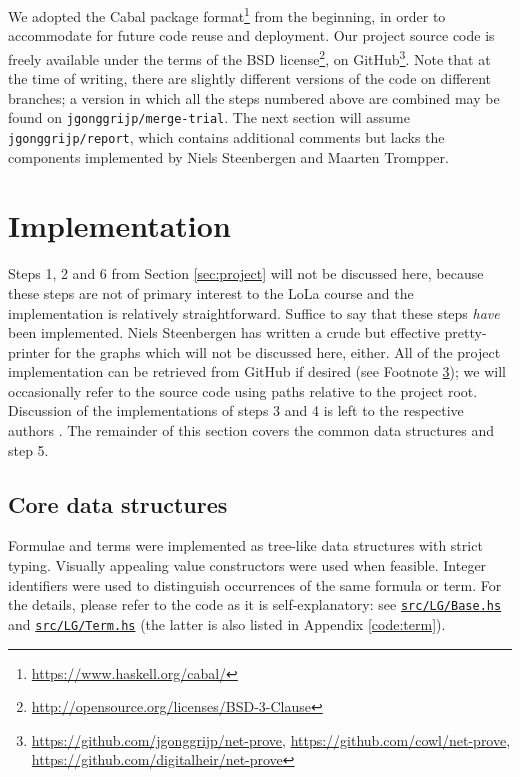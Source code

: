 \documentclass[12pt,a4paper]{article}
\newcommand{\coderef}[1]{\href{https://github.com/jgonggrijp/net-prove/blob/report/#1}{\texttt{#1}}}
\begin{document}
We adopted the Cabal package format\footnote{\url{https://www.haskell.org/cabal/}} from the beginning, in order to accommodate for future code reuse and deployment. Our project source code is freely available under the terms of the BSD license\footnote{\url{http://opensource.org/licenses/BSD-3-Clause}}, on GitHub\footnote{\url{https://github.com/jgonggrijp/net-prove}, \url{https://github.com/cowl/net-prove}, \url{https://github.com/digitalheir/net-prove}\label{ftn:github}}. Note that at the time of writing, there are slightly different versions of the code on different branches; a version in which all the steps numbered above are combined may be found on \texttt{jgonggrijp/merge-trial}. The next section will assume \texttt{jgonggrijp/report}, which contains additional comments but lacks the components implemented by Niels Steenbergen and Maarten Trompper.


\section{Implementation}

Steps 1, 2 and 6 from Section \ref{sec:project} will not be discussed here, because these steps are not of primary interest to the LoLa course and the implementation is relatively straightforward. Suffice to say that these steps \emph{have} been implemented. Niels Steenbergen has written a crude but effective pretty-printer for the graphs which will not be discussed here, either. All of the project implementation can be retrieved from GitHub if desired (see Footnote \ref{ftn:github}); we will occasionally refer to the source code using paths relative to the project root. Discussion of the implementations of steps 3 and 4 is left to the respective authors \cite{maarten,niels}. The remainder of this section covers the common data structures and step 5.


\subsection{Core data structures}

Formulae and terms were implemented as tree-like data structures with strict typing. Visually appealing value constructors were used when feasible. Integer identifiers were used to distinguish occurrences of the same formula or term. For the details, please refer to the code as it is self-explanatory: see \coderef{src/LG/Base.hs} and \coderef{src/LG/Term.hs} (the latter is also listed in Appendix \ref{code:term}).
\end{document}
